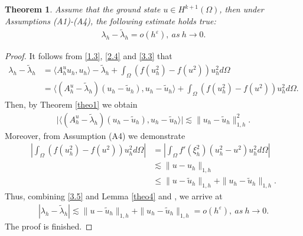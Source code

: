 \documentclass[compress, preprint,9pt]{elsarticle}
\numberwithin{equation}{section}
\newtheorem{theo}{Theorem}[section]
\newcommand{\eps}{\varepsilon}
\newcommand{\la}{\langle}
\newcommand{\ran}{\rangle}
\begin{document}
\begin{theo}\label{theo5}
	Assume that the ground state $u\in H^{k+1}(\Omega)$, then under Assumptions (A1)-(A4), the following estimate holds true:
	\begin{eqnarray*}
		\lambda_h-\widetilde{\lambda}_h=o(h^{\eps}),~as~h\rightarrow0.
	\end{eqnarray*}
\end{theo}
\begin{proof}
	It follows from \eqref{1.3}, \eqref{2.4} and \eqref{3.3} that
	\begin{equation}\label{3.19}
		\begin{aligned}
			\lambda_h-\widetilde{\lambda}_h&=\la A_h^u u_h,u_h\ran-\widetilde{\lambda}_h+\int_\Omega (f(u_h^2)-f(u^2))u_h^2 d\Omega\\
			&=\la (A_h^u-\widetilde{\lambda}_h) (u_h-\widetilde{u}_h),u_h-\widetilde{u}_h\ran+\int_\Omega (f(u_h^2)-f(u^2))u_h^2 d\Omega.
		\end{aligned}
	\end{equation}
	Then, by Theorem \ref{theo1} we obtain
	\begin{eqnarray*}
		\Big|\la (A_h^u-\widetilde{\lambda}_h) (u_h-\widetilde{u}_h),u_h-\widetilde{u}_h\ran\Big|\lesssim\|u_h-\widetilde{u}_h\|_{1,h}^2.
	\end{eqnarray*}
	Moreover, from Assumption (A4) we demonstrate
	\begin{eqnarray*}
		\left|\int_\Omega (f(u_h^2)-f(u^2))u_h^2 d\Omega\right|&=\left|\int_\Omega f'(\xi_h^2)(u_h^2-u^2)u_h^2 d\Omega\right|\\
		&\lesssim \|u-u_h\|_{1,h}\\
		&\le\|u-\widetilde{u}_h\|_{1,h}+\|u_h-\widetilde{u}_h\|_{1,h}.
	\end{eqnarray*}
	Thus, combining \eqref{3.5} and Lemma \ref{theo4} and , we arrive at
	\begin{eqnarray*}
		|\lambda_h-\widetilde{\lambda}_h|\lesssim \|u-\widetilde{u}_h\|_{1,h}+\|u_h-\widetilde{u}_h\|_{1,h}=o(h^{\eps}),~ as ~h\rightarrow0.
	\end{eqnarray*}
	The proof is finished.
\end{proof}
\end{document}
